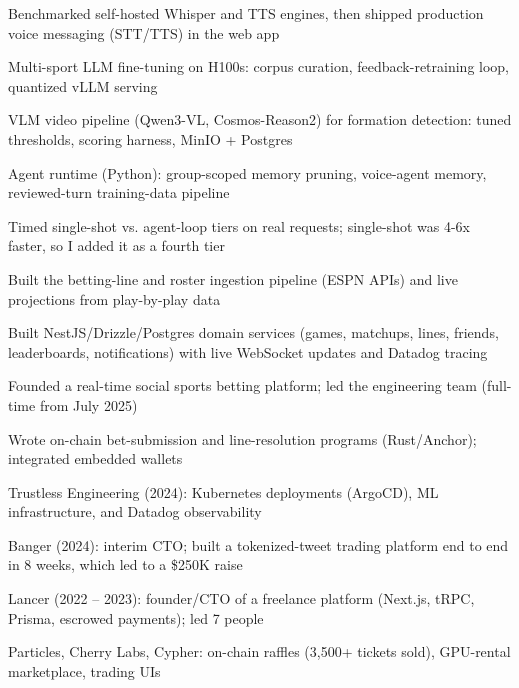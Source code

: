 \documentclass[print]{jack-resume}
\begin{document}
\begin{tightemize}
    \item Benchmarked self-hosted Whisper and TTS engines, then shipped production voice messaging (STT/TTS) in the web app
    \item Multi-sport LLM fine-tuning on H100s: corpus curation, feedback-retraining loop, quantized vLLM serving
    \item VLM video pipeline (Qwen3-VL, Cosmos-Reason2) for formation detection: tuned thresholds, scoring harness, MinIO + Postgres
    \item Agent runtime (Python): group-scoped memory pruning, voice-agent memory, reviewed-turn training-data pipeline
    \item Timed single-shot vs. agent-loop tiers on real requests; single-shot was 4-6x faster, so I added it as a fourth tier
\end{tightemize}
\sectionsep

\begin{tightemize}
    \item Built the betting-line and roster ingestion pipeline (ESPN APIs) and live projections from play-by-play data
    \item Built NestJS/Drizzle/Postgres domain services (games, matchups, lines, friends, leaderboards, notifications) with live WebSocket updates and Datadog tracing
    \item Founded a real-time social sports betting platform; led the engineering team (full-time from July 2025)
    \item Wrote on-chain bet-submission and line-resolution programs (Rust/Anchor); integrated embedded wallets
\end{tightemize}
\sectionsep

\begin{tightemize}
    \item Trustless Engineering (2024): Kubernetes deployments (ArgoCD), ML infrastructure, and Datadog observability
    \item Banger (2024): interim CTO; built a tokenized-tweet trading platform end to end in 8 weeks, which led to a \$250K raise
    \item Lancer (2022 -- 2023): founder/CTO of a freelance platform (Next.js, tRPC, Prisma, escrowed payments); led 7 people
    \item Particles, Cherry Labs, Cypher: on-chain raffles (3,500+ tickets sold), GPU-rental marketplace, trading UIs
\end{tightemize}
\sectionsep
\end{document}

